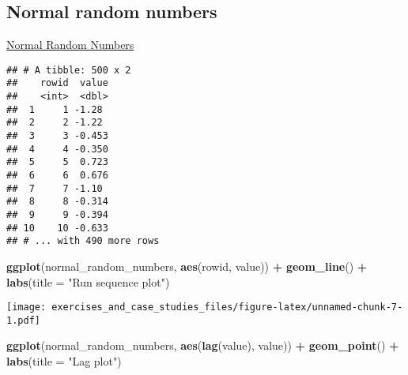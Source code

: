 \documentclass[]{book}
\newenvironment{Shaded}{\begin{snugshade}}{\end{snugshade}}
\newcommand{\DataTypeTok}[1]{\textcolor[rgb]{0.13,0.29,0.53}{#1}}
\newcommand{\DecValTok}[1]{\textcolor[rgb]{0.00,0.00,0.81}{#1}}
\newcommand{\KeywordTok}[1]{\textcolor[rgb]{0.13,0.29,0.53}{\textbf{#1}}}
\newcommand{\NormalTok}[1]{#1}
\newcommand{\OperatorTok}[1]{\textcolor[rgb]{0.81,0.36,0.00}{\textbf{#1}}}
\newcommand{\StringTok}[1]{\textcolor[rgb]{0.31,0.60,0.02}{#1}}
\theoremstyle{definition}
\theoremstyle{definition}
\theoremstyle{definition}
\theoremstyle{remark}
\begin{document}
\hypertarget{normal-random-numbers}{%
\subsection{Normal random numbers}\label{normal-random-numbers}}

\href{https://www.itl.nist.gov/div898/handbook/eda/section4/eda421.htm}{Normal
Random Numbers}

\begin{Shaded}
\end{Shaded}

\begin{verbatim}
## # A tibble: 500 x 2
##    rowid  value
##    <int>  <dbl>
##  1     1 -1.28 
##  2     2 -1.22 
##  3     3 -0.453
##  4     4 -0.350
##  5     5  0.723
##  6     6  0.676
##  7     7 -1.10 
##  8     8 -0.314
##  9     9 -0.394
## 10    10 -0.633
## # ... with 490 more rows
\end{verbatim}

\begin{Shaded}
\begin{Highlighting}[]
\KeywordTok{ggplot}\NormalTok{(normal_random_numbers, }\KeywordTok{aes}\NormalTok{(rowid, value)) }\OperatorTok{+}
\StringTok{  }\KeywordTok{geom_line}\NormalTok{() }\OperatorTok{+}
\StringTok{  }\KeywordTok{labs}\NormalTok{(}\DataTypeTok{title =} \StringTok{"Run sequence plot"}\NormalTok{)}
\end{Highlighting}
\end{Shaded}

\texttt{[image: exercises\_and\_case\_studies\_files/figure-latex/unnamed-chunk-7-1.pdf]}

\begin{Shaded}
\begin{Highlighting}[]
\KeywordTok{ggplot}\NormalTok{(normal_random_numbers, }\KeywordTok{aes}\NormalTok{(}\KeywordTok{lag}\NormalTok{(value), value)) }\OperatorTok{+}
\StringTok{  }\KeywordTok{geom_point}\NormalTok{() }\OperatorTok{+}
\StringTok{  }\KeywordTok{labs}\NormalTok{(}\DataTypeTok{title =} \StringTok{"Lag plot"}\NormalTok{)}
\end{Highlighting}
\end{Shaded}
\end{document}
